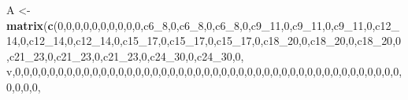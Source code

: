 \documentclass[]{article}
\newenvironment{Shaded}{\begin{snugshade}}{\end{snugshade}}
\newcommand{\DecValTok}[1]{\textcolor[rgb]{0.00,0.00,0.81}{#1}}
\newcommand{\KeywordTok}[1]{\textcolor[rgb]{0.13,0.29,0.53}{\textbf{#1}}}
\newcommand{\NormalTok}[1]{#1}
\newcommand{\StringTok}[1]{\textcolor[rgb]{0.31,0.60,0.02}{#1}}
\begin{document}
\begin{Shaded}
\begin{Highlighting}[]
\NormalTok{A <-}\StringTok{ }\KeywordTok{matrix}\NormalTok{(}\KeywordTok{c}\NormalTok{(}\DecValTok{0}\NormalTok{,}\DecValTok{0}\NormalTok{,}\DecValTok{0}\NormalTok{,}\DecValTok{0}\NormalTok{,}\DecValTok{0}\NormalTok{,}\DecValTok{0}\NormalTok{,}\DecValTok{0}\NormalTok{,}\DecValTok{0}\NormalTok{,}\DecValTok{0}\NormalTok{,}\DecValTok{0}\NormalTok{,c6_}\DecValTok{8}\NormalTok{,}\DecValTok{0}\NormalTok{,c6_}\DecValTok{8}\NormalTok{,}\DecValTok{0}\NormalTok{,c6_}\DecValTok{8}\NormalTok{,}\DecValTok{0}\NormalTok{,c9_}\DecValTok{11}\NormalTok{,}\DecValTok{0}\NormalTok{,c9_}\DecValTok{11}\NormalTok{,}\DecValTok{0}\NormalTok{,c9_}\DecValTok{11}\NormalTok{,}\DecValTok{0}\NormalTok{,c12_}\DecValTok{14}\NormalTok{,}\DecValTok{0}\NormalTok{,c12_}\DecValTok{14}\NormalTok{,}\DecValTok{0}\NormalTok{,c12_}\DecValTok{14}\NormalTok{,}\DecValTok{0}\NormalTok{,c15_}\DecValTok{17}\NormalTok{,}\DecValTok{0}\NormalTok{,c15_}\DecValTok{17}\NormalTok{,}\DecValTok{0}\NormalTok{,c15_}\DecValTok{17}\NormalTok{,}\DecValTok{0}\NormalTok{,c18_}\DecValTok{20}\NormalTok{,}\DecValTok{0}\NormalTok{,c18_}\DecValTok{20}\NormalTok{,}\DecValTok{0}\NormalTok{,c18_}\DecValTok{20}\NormalTok{,}\DecValTok{0}\NormalTok{,c21_}\DecValTok{23}\NormalTok{,}\DecValTok{0}\NormalTok{,c21_}\DecValTok{23}\NormalTok{,}\DecValTok{0}\NormalTok{,c21_}\DecValTok{23}\NormalTok{,}\DecValTok{0}\NormalTok{,c24_}\DecValTok{30}\NormalTok{,}\DecValTok{0}\NormalTok{,c24_}\DecValTok{30}\NormalTok{,}\DecValTok{0}\NormalTok{,}
\NormalTok{v,}\DecValTok{0}\NormalTok{,}\DecValTok{0}\NormalTok{,}\DecValTok{0}\NormalTok{,}\DecValTok{0}\NormalTok{,}\DecValTok{0}\NormalTok{,}\DecValTok{0}\NormalTok{,}\DecValTok{0}\NormalTok{,}\DecValTok{0}\NormalTok{,}\DecValTok{0}\NormalTok{,}\DecValTok{0}\NormalTok{,}\DecValTok{0}\NormalTok{,}\DecValTok{0}\NormalTok{,}\DecValTok{0}\NormalTok{,}\DecValTok{0}\NormalTok{,}\DecValTok{0}\NormalTok{,}\DecValTok{0}\NormalTok{,}\DecValTok{0}\NormalTok{,}\DecValTok{0}\NormalTok{,}\DecValTok{0}\NormalTok{,}\DecValTok{0}\NormalTok{,}\DecValTok{0}\NormalTok{,}\DecValTok{0}\NormalTok{,}\DecValTok{0}\NormalTok{,}\DecValTok{0}\NormalTok{,}\DecValTok{0}\NormalTok{,}\DecValTok{0}\NormalTok{,}\DecValTok{0}\NormalTok{,}\DecValTok{0}\NormalTok{,}\DecValTok{0}\NormalTok{,}\DecValTok{0}\NormalTok{,}\DecValTok{0}\NormalTok{,}\DecValTok{0}\NormalTok{,}\DecValTok{0}\NormalTok{,}\DecValTok{0}\NormalTok{,}\DecValTok{0}\NormalTok{,}\DecValTok{0}\NormalTok{,}\DecValTok{0}\NormalTok{,}\DecValTok{0}\NormalTok{,}\DecValTok{0}\NormalTok{,}\DecValTok{0}\NormalTok{,}\DecValTok{0}\NormalTok{,}\DecValTok{0}\NormalTok{,}\DecValTok{0}\NormalTok{,}\DecValTok{0}\NormalTok{,}\DecValTok{0}\NormalTok{,}\DecValTok{0}\NormalTok{,}\DecValTok{0}\NormalTok{,}\DecValTok{0}\NormalTok{,}\DecValTok{0}\NormalTok{,}

\end{Highlighting}
\end{Shaded}
\end{document}

